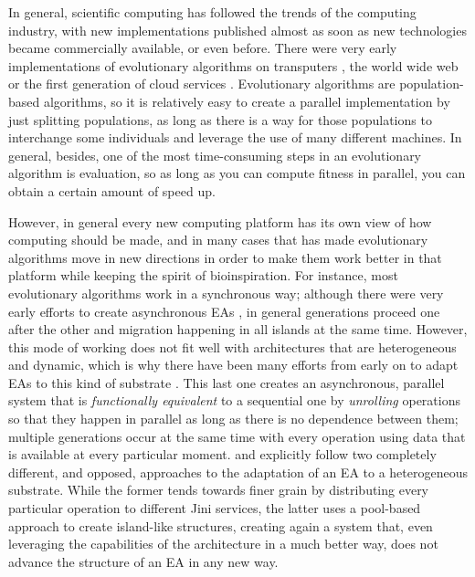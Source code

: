 \documentclass{llncs}
\begin{document}
  In general, scientific computing has followed the trends of the
  computing industry, with new implementations published almost as soon
  as new technologies became commercially available, or even
  before. There were very early implementations of evolutionary
  algorithms on transputers \cite{voigt1990modelling}, the world wide
  web \cite{chong:1999:jDGPi} or the first generation of cloud
  services
  \cite{DBLP:journals/corr/abs-1105-6205,de2017parallel,salza2017ccube}. Evolutionary
  algorithms are population-based algorithms, so it is relatively easy
  to create a parallel implementation by just splitting populations, as
  long as there is a way for those populations to interchange some
  individuals and leverage the use of many different machines. In
  general, besides, one of the most time-consuming steps in an
  evolutionary algorithm is evaluation, so as long as you can compute
  fitness in parallel, you can obtain a certain amount of speed up.

  However, in general every new computing platform has its own view of
  how computing should be made, and in many cases that has made
  evolutionary algorithms move in new directions in order to make them
  work better in that platform while keeping the spirit of
  bioinspiration. For instance, most evolutionary algorithms work in a
  synchronous way; although there were very early efforts to create
  asynchronous EAs \cite{coleman89}, in general
  generations proceed one after the other and migration happening in
  all islands at the same time. However, this mode of working does not
  fit well with architectures that are heterogeneous and dynamic, which
  is why there have been many efforts from early
  on to adapt EAs to this kind of substrate
  \cite{Jini:FEA2000,zorman2002creation,baugh2003asynchronous}. This
  last one creates an asynchronous, parallel system that is {\em functionally
    equivalent} to a sequential one by {\em unrolling} operations so
  that they happen in parallel as long as there is no dependence between
  them; multiple generations occur at the same time with every operation
  using data that is available at every particular
  moment. \cite{Jini:FEA2000} and \cite{zorman2002creation} explicitly
  follow two completely different, and opposed, approaches to the
  adaptation of an EA to a heterogeneous substrate. While the former
  tends towards finer grain by distributing every particular operation
  to different Jini services, the latter uses a pool-based approach to
  create island-like structures, creating again a system that, even
  leveraging the capabilities of the architecture in a much better way,
  does not advance the  structure of an EA in any new way.
\end{document}
